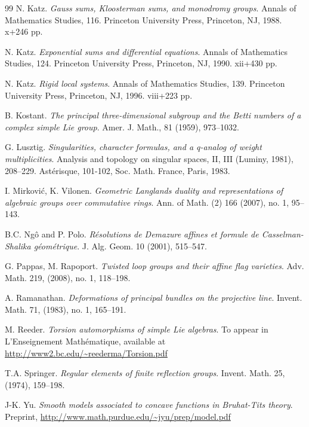 \begin{thebibliography}{99}
 N. Katz. \emph{Gauss sums, Kloosterman sums, and monodromy groups}. Annals of Mathematics Studies, 116. Princeton University Press, Princeton, NJ, 1988. x+246 pp.

 N. Katz. \emph{Exponential sums and differential equations}. Annals of Mathematics Studies, 124. Princeton University Press, Princeton, NJ, 1990. xii+430 pp.

 N. Katz. \emph{Rigid local systems}. Annals of Mathematics Studies, 139. Princeton University Press, Princeton, NJ, 1996. viii+223 pp.

 B. Kostant. \emph{The principal three-dimensional subgroup and the Betti numbers of a complex simple Lie group}. Amer. J. Math., 81 (1959), 973--1032.

 G. Lusztig. \emph{Singularities, character formulas, and a q-analog of weight multiplicities}. Analysis and topology on singular spaces, II, III (Luminy, 1981), 208--229. Astérisque, 101-102, Soc. Math. France, Paris, 1983.

 I. Mirković, K. Vilonen. \emph{Geometric Langlands duality and representations of algebraic groups over commutative rings}. Ann. of Math. (2) 166 (2007), no. 1, 95--143.

 B.C. Ngô and P. Polo. \emph{Résolutions de Demazure affines et formule de Casselman-Shalika géométrique}. J. Alg. Geom. 10 (2001), 515--547.

 G. Pappas, M. Rapoport. \emph{Twisted loop groups and their affine flag varieties}. Adv. Math. 219, (2008), no. 1, 118--198.

 A. Ramanathan. \emph{Deformations of principal bundles on the projective line}. Invent. Math. 71, (1983), no. 1, 165--191.

 M. Reeder. \emph{Torsion automorphisms of simple Lie algebras}. To appear in L'Enseignement Mathématique, available at \url{http://www2.bc.edu/~reederma/Torsion.pdf}

 T.A. Springer. \emph{Regular elements of finite reflection groups}. Invent. Math. 25, (1974), 159--198.

 J-K. Yu. \emph{Smooth models associated to concave functions in Bruhat-Tits theory}. Preprint, \url{http://www.math.purdue.edu/~jyu/prep/model.pdf}

\end{thebibliography}

\vspace{1em}
